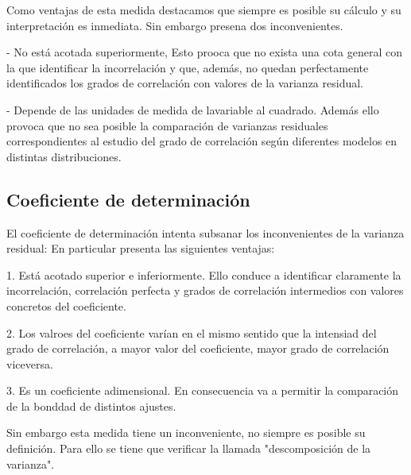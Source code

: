 \documentclass{article}
\begin{document}
\vspace{2mm}

Como ventajas de esta medida destacamos que siempre es posible su cálculo y su interpretación es inmediata. Sin embargo presena dos inconvenientes.

\vspace{2mm}

- No está acotada superiormente, Esto prooca que no exista una cota general con la que identificar la incorrelación y que, además, no quedan perfectamente identificados los grados de correlación con valores de la varianza residual. 

\vspace{2mm}

- Depende de las unidades de medida de lavariable al cuadrado. Además ello provoca que no sea posible la comparación de varianzas residuales correspondientes al estudio del grado de correlación según diferentes modelos en distintas distribuciones.

\subsection{Coeficiente de determinación}

	El coeficiente de determinación intenta subsanar los inconvenientes de la varianza residual: En particular presenta las siguientes ventajas:
	\vspace{2mm}
	
	1. Está acotado superior e inferiormente. Ello conduce a identificar claramente la incorrelación, correlación perfecta y grados de correlación intermedios con valores concretos del coeficiente.
	
	\vspace{2mm}
	
	2. Los valroes del coeficiente varían en el mismo sentido que la intensiad del grado de correlación, a mayor valor del coeficiente, mayor grado de correlación viceversa.
	
	\vspace{2mm}
	
	3. Es un coeficiente adimensional. En consecuencia va a permitir la comparación de la bonddad de distintos ajustes.
	
	\vspace{2mm}
	
	Sin embargo esta medida tiene un inconveniente, no siempre es posible su definición. Para ello se tiene que verificar la llamada "descomposición de la varianza".
	
\end{document}
